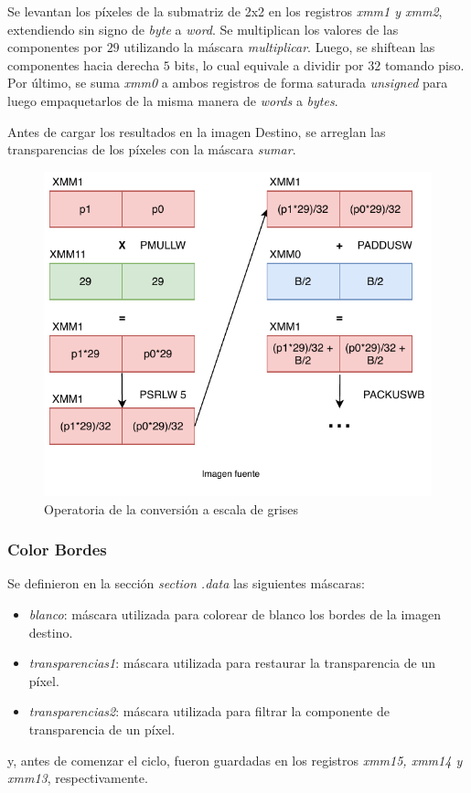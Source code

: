 \documentclass[a4paper]{article}
\begin{document}
\begin{itemize}
\begin{enumerate}
 	Se levantan los píxeles de la submatriz de 2x2 en los registros \textit{xmm1 y xmm2}, extendiendo sin signo de \textit{byte} a \textit{word}. Se multiplican los valores de las componentes por $29$ utilizando la máscara \textit{multiplicar}. Luego, se shiftean las componentes hacia derecha $5$ bits, lo cual equivale a dividir por $32$ tomando piso. Por último, se suma \textit{xmm0} a ambos registros de forma saturada \textit{unsigned} para luego empaquetarlos de la  misma manera de \textit{words} a \textit{bytes}. 
 	
 	Antes de cargar los resultados en la imagen Destino, se arreglan las transparencias de los píxeles con la máscara \textit{sumar}. 
 	
 \begin{figure}[h]
 	\centering
 	\includegraphics[scale = 0.66]{img/ImFan3.pdf}
 	\caption{Operatoria de la conversión a escala de grises}
 \end{figure}
 	
 	    
 \end{enumerate}
 
	
\end{itemize}	 

\newpage
\subsubsection{Color Bordes}
Se definieron en la sección \textit{section .data} las siguientes máscaras:

\begin{itemize}
	\item \textit{blanco}: máscara utilizada para colorear de blanco los bordes de la imagen destino.
	\item \textit{transparencias1}: máscara utilizada para restaurar la transparencia de un píxel.
	\item \textit{transparencias2}: máscara utilizada para filtrar la componente de transparencia de un píxel.	
\end{itemize}	
\justify
y, antes de comenzar el ciclo, fueron guardadas en los registros \textit{xmm15, xmm14 y xmm13}, respectivamente.
\end{document}
